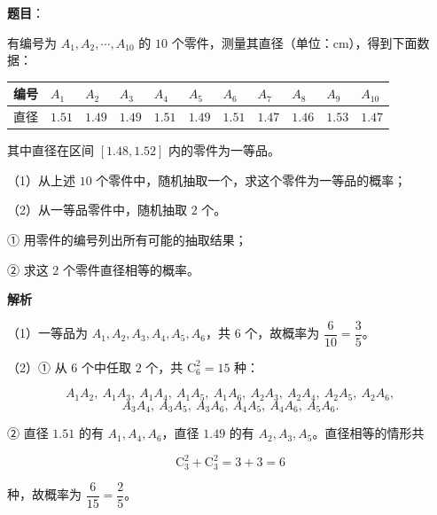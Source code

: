 \begin{answer}

\textbf{题目}：

有编号为 $A_1,A_2,\cdots,A_{10}$ 的 $10$ 个零件，测量其直径（单位：$\mathrm{cm}$），得到下面数据：

\begin{center}
\begingroup\setlength{\tabcolsep}{4pt}
\begin{tabular}{lllllllllll}
\toprule
编号 & $A_1$ & $A_2$ & $A_3$ & $A_4$ & $A_5$ & $A_6$ & $A_7$ & $A_8$ & $A_9$ & $A_{10}$ \\
\midrule
直径 & $1.51$ & $1.49$ & $1.49$ & $1.51$ & $1.49$ & $1.51$ & $1.47$ & $1.46$ & $1.53$ & $1.47$ \\
\bottomrule
\end{tabular}
\endgroup
\end{center}

其中直径在区间 $[1.48,1.52]$ 内的零件为一等品。

（1）从上述 $10$ 个零件中，随机抽取一个，求这个零件为一等品的概率；

（2）从一等品零件中，随机抽取 $2$ 个。

① 用零件的编号列出所有可能的抽取结果；

② 求这 $2$ 个零件直径相等的概率。

\textbf{解析}

（1）一等品为 $A_1,A_2,A_3,A_4,A_5,A_6$，共 $6$ 个，故概率为 $\dfrac6{10}=\dfrac35$。

（2）① 从 $6$ 个中任取 $2$ 个，共 $\mathrm C_6^2=15$ 种：

\nopagebreak[4]
\[A_1A_2,\ A_1A_3,\ A_1A_4,\ A_1A_5,\ A_1A_6,\ A_2A_3,\ A_2A_4,\ A_2A_5,\ A_2A_6,\]
\nopagebreak[4]
\[A_3A_4,\ A_3A_5,\ A_3A_6,\ A_4A_5,\ A_4A_6,\ A_5A_6.\]

② 直径 $1.51$ 的有 $A_1,A_4,A_6$，直径 $1.49$ 的有 $A_2,A_3,A_5$。直径相等的情形共

\nopagebreak[4]
\[\mathrm C_3^2+\mathrm C_3^2=3+3=6\]

种，故概率为 $\dfrac6{15}=\dfrac25$。


\end{answer}
